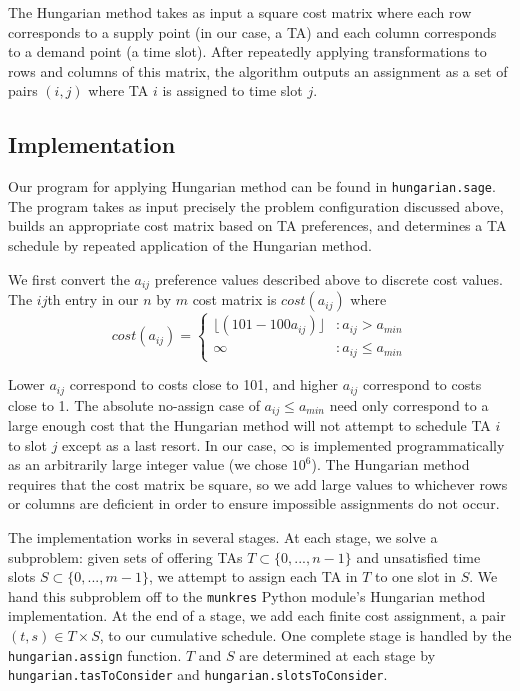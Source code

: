 \documentclass{article}
\begin{document}
\begin{multicols}{2}
The Hungarian method takes as input a square cost matrix where each row corresponds to a supply point (in our case, a TA) and each column corresponds to a demand point (a time slot). After repeatedly applying transformations to rows and columns of this matrix, the algorithm outputs an assignment as a set of pairs $(i, j)$ where TA $i$ is assigned to time slot $j$.

\subsection*{Implementation}

Our program for applying Hungarian method can be found in \texttt{hungarian.sage}. The program takes as input precisely the problem configuration discussed above, builds an appropriate cost matrix based on TA preferences, and determines a TA schedule by repeated application of the Hungarian method.

We first convert the $a_{ij}$ preference values described above to discrete cost values. The $ij$th entry in our $n$ by $m$ cost matrix is $cost(a_{ij})$ where
\begin{equation}
cost(a_{ij}) = \left\{
   \begin{array}{lr}
      \lfloor(101 - 100a_{ij})\rfloor & : a_{ij} > a_{min} \\
      \infty & : a_{ij} \leq a_{min}
   \end{array}
   \right.
\end{equation}

Lower $a_{ij}$ correspond to costs close to 101, and higher $a_{ij}$ correspond to costs close to 1. The absolute no-assign case of $a_{ij} \leq a_{min}$ need only correspond to a large enough cost that the Hungarian method will not attempt to schedule TA $i$ to slot $j$ except as a last resort. In our case, $\infty$ is implemented programmatically as an arbitrarily large integer value (we chose $10^6$). The Hungarian method requires that the cost matrix be square, so we add large values to whichever rows or columns are deficient in order to ensure impossible assignments do not occur.

The implementation works in several stages. At each stage, we solve a subproblem: given sets of offering TAs $T \subset \{0, ..., n - 1\}$ and unsatisfied time slots $S \subset \{0, ..., m - 1\}$, we attempt to assign each TA in $T$ to one slot in $S$. We hand this subproblem off to the \texttt{munkres} Python module's Hungarian method implementation. At the end of a stage, we add each finite cost assignment, a pair $(t, s) \in T \times S$, to our cumulative schedule. One complete stage is handled by the \texttt{hungarian.assign} function. $T$ and $S$ are determined at each stage by \texttt{hungarian.tasToConsider} and \texttt{hungarian.slotsToConsider}.


\end{multicols}
\end{document}
